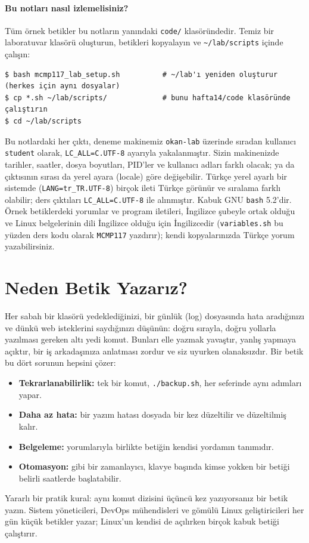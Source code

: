 \paragraph{Bu notları nasıl izlemelisiniz?} Tüm örnek betikler bu notların yanındaki \texttt{code/} klasöründedir. Temiz bir laboratuvar klasörü oluşturun, betikleri kopyalayın ve \texttt{\textasciitilde/lab/scripts} içinde çalışın:
\begin{lstlisting}[style=term]
$ bash mcmp117_lab_setup.sh          # ~/lab'ı yeniden oluşturur (herkes için aynı dosyalar)
$ cp *.sh ~/lab/scripts/             # bunu hafta14/code klasöründe çalıştırın
$ cd ~/lab/scripts
\end{lstlisting}
Bu notlardaki her çıktı, deneme makinemiz \texttt{okan-lab} üzerinde sıradan kullanıcı \texttt{student} olarak, \texttt{LC\_ALL=C.UTF-8} ayarıyla yakalanmıştır. Sizin makinenizde tarihler, saatler, dosya boyutları, PID'ler ve kullanıcı adları farklı olacak;  ya da  çıktısının sırası da yerel ayara (locale) göre değişebilir. Türkçe yerel ayarlı bir sistemde (\texttt{LANG=tr\_TR.UTF-8}) birçok ileti Türkçe görünür ve sıralama farklı olabilir; ders çıktıları \texttt{LC\_ALL=C.UTF-8} ile alınmıştır. Kabuk GNU \texttt{bash} 5.2'dir. Örnek betiklerdeki yorumlar ve program iletileri, İngilizce şubeyle ortak olduğu ve Linux belgelerinin dili İngilizce olduğu için İngilizcedir (\texttt{variables.sh} bu yüzden ders kodu olarak \texttt{MCMP117} yazdırır); kendi kopyalarınızda Türkçe yorum yazabilirsiniz.

\section{Neden Betik Yazarız?}

Her sabah bir klasörü yedeklediğinizi, bir günlük (log) dosyasında hata aradığınızı ve dünkü web isteklerini saydığınızı düşünün: doğru sırayla, doğru yollarla yazılması gereken altı yedi komut. Bunları elle yazmak yavaştır, yanlış yapmaya açıktır, bir iş arkadaşınıza anlatması zordur ve siz uyurken olanaksızdır. Bir betik bu dört sorunun hepsini çözer:
\begin{itemize}
  \item \textbf{Tekrarlanabilirlik:} tek bir komut, \texttt{./backup.sh}, her seferinde aynı adımları yapar.
  \item \textbf{Daha az hata:} bir yazım hatası dosyada bir kez düzeltilir ve düzeltilmiş kalır.
  \item \textbf{Belgeleme:} yorumlarıyla birlikte betiğin kendisi yordamın tanımıdır.
  \item \textbf{Otomasyon:}  gibi bir zamanlayıcı, klavye başında kimse yokken bir betiği belirli saatlerde başlatabilir.
\end{itemize}
Yararlı bir pratik kural: aynı komut dizisini üçüncü kez yazıyorsanız bir betik yazın. Sistem yöneticileri, DevOps mühendisleri ve gömülü Linux geliştiricileri her gün küçük betikler yazar; Linux'un kendisi de açılırken birçok kabuk betiği çalıştırır.

